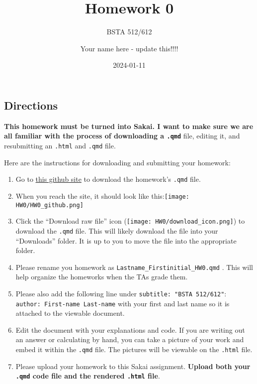 \documentclass[
  letterpaper,
  DIV=11,
  numbers=noendperiod]{scrartcl}
\title{Homework 0}
\subtitle{BSTA 512/612}
\author{Your name here - update this!!!!}
\date{2024-01-11}
\begin{document}
\maketitle
\ifdefined\Shaded\renewenvironment{Shaded}{\begin{tcolorbox}[interior hidden, borderline west={3pt}{0pt}{shadecolor}, breakable, boxrule=0pt, frame hidden, enhanced, sharp corners]}{\end{tcolorbox}}\fi

\hypertarget{directions}{%
\subsection{Directions}\label{directions}}

\textbf{This homework must be turned into Sakai. I want to make sure we
are all familiar with the process of downloading a \texttt{.qmd}} file,
editing it, and resubmitting an \texttt{.html} and \texttt{.qmd} file.

Here are the instructions for downloading and submitting your homework:

\begin{enumerate}
\def\labelenumi{\arabic{enumi}.}
\item
  Go to
  \href{https://github.com/nwakim/W2024_BSTA_512/blob/main/homework/HW0.qmd}{this
  github site} to download the homework's \texttt{.qmd} file.
\item
  When you reach the site, it should look like
  this:\texttt{[image: HW0/HW0\_github.png]}
\item
  Click the ``Download raw file'' icon
  (\texttt{[image: HW0/download\_icon.png]})
  to download the \texttt{.qmd} file. This will likely download the file
  into your ``Downloads'' folder. It is up to you to move the file into
  the appropriate folder.
\item
  Please rename you homework as \texttt{Lastname\_Firstinitial\_HW0.qmd}
  . This will help organize the homeworks when the TAs grade them.
\item
  Please also add the following line under
  \texttt{subtitle:\ "BSTA\ 512/612"}:
  \texttt{author:\ First-name\ Last-name} with your first and last name
  so it is attached to the viewable document.
\item
  Edit the document with your explanations and code. If you are writing
  out an answer or calculating by hand, you can take a picture of your
  work and embed it within the \texttt{.qmd} file. The pictures will be
  viewable on the \texttt{.html} file.
\item
  Please upload your homework to this Sakai assignment. \textbf{Upload
  both your \texttt{.qmd} code file and the rendered \texttt{.html}
  file}.
\end{enumerate}
\end{document}
